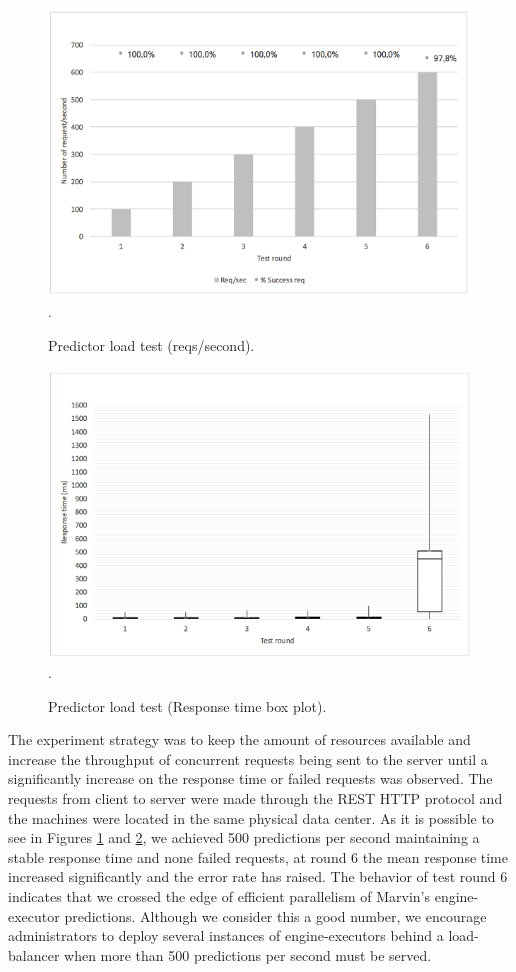 \documentclass[twoside,11pt]{article}
\begin{document}
\begin{figure}[h]
\centering
\includegraphics[scale=1]{fig/performance_1.png}
\DeclareGraphicsExtensions.
\caption{Predictor load test (reqs/second).}
\label{fig_load}
\end{figure}

\begin{figure}[h]
\centering
\includegraphics[scale=1]{fig/performance_2.png}
\DeclareGraphicsExtensions.
\caption{Predictor load test (Response time box plot).}
\label{fig_load_2}
\end{figure}

The experiment strategy was to keep the amount of resources available and increase the throughput of concurrent requests being sent to the server until a significantly increase on the response time or failed requests was observed. The requests from client to server were made through the REST HTTP protocol and the machines were located in the same physical data center. As it is possible to see in Figures \ref{fig_load} and \ref{fig_load_2}, we achieved 500 predictions per second maintaining a stable response time and none failed requests, at round 6 the mean response time increased significantly and the error rate has raised. The behavior of test round 6 indicates that we crossed the edge of efficient parallelism of Marvin's engine-executor predictions. Although we consider this a good number, we encourage administrators to deploy several instances of engine-executors behind a load-balancer when more than 500 predictions per second must be served.
\end{document}
